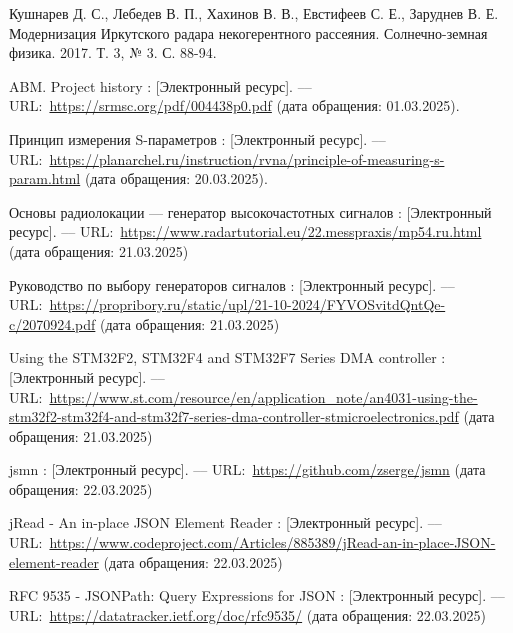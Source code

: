 \documentclass{report}
\begin{document}
\begin{thebibliography}{}

 Кушнарев Д. С., Лебедев В. П., Хахинов В. В., Евстифеев С. Е., Заруднев В. Е. Модернизация Иркутского радара некогерентного рассеяния. Солнечно-земная физика. 2017. Т. 3, № 3. С. 88-94.

 ABM. Project history : [Электронный ресурс]. --– URL:~\url{https://srmsc.org/pdf/004438p0.pdf} (дата обращения: 01.03.2025).

 Принцип измерения S-параметров : [Электронный ресурс]. --– URL:~\url{https://planarchel.ru/instruction/rvna/principle-of-measuring-s-param.html} (дата обращения: 20.03.2025).

 Основы радиолокации --- генератор высокочастотных сигналов : [Электронный ресурс]. --– URL:~\url{https://www.radartutorial.eu/22.messpraxis/mp54.ru.html} (дата обращения: 21.03.2025)

 Руководство по выбору генераторов сигналов : [Электронный ресурс]. --– URL:~\url{https://propribory.ru/static/upl/21-10-2024/FYVOSvitdQntQe-c/2070924.pdf} (дата обращения: 21.03.2025)

 Using the STM32F2, STM32F4 and STM32F7 Series DMA controller : [Электронный ресурс]. --– URL:~\url{https://www.st.com/resource/en/application_note/an4031-using-the-stm32f2-stm32f4-and-stm32f7-series-dma-controller-stmicroelectronics.pdf} (дата обращения: 21.03.2025)

 jsmn : [Электронный ресурс]. --– URL:~\url{https://github.com/zserge/jsmn} (дата обращения: 22.03.2025)

 jRead - An in-place JSON Element Reader : [Электронный ресурс]. --– URL:~\url{https://www.codeproject.com/Articles/885389/jRead-an-in-place-JSON-element-reader} (дата обращения: 22.03.2025)

 RFC 9535 - JSONPath: Query Expressions for JSON : [Электронный ресурс]. --– URL:~\url{https://datatracker.ietf.org/doc/rfc9535/} (дата обращения: 22.03.2025)

\end{thebibliography}



\end{document}
